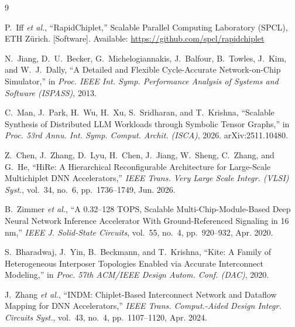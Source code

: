 \documentclass[conference]{IEEEtran}
\begin{document}
\begin{thebibliography}{9}

P.~Iff \emph{et al.}, ``RapidChiplet,'' Scalable Parallel Computing Laboratory (SPCL), ETH Z\"urich. [Software]. Available: \url{https://github.com/spcl/rapidchiplet}

N.~Jiang, D.~U.~Becker, G.~Michelogiannakis, J.~Balfour, B.~Towles, J.~Kim, and W.~J.~Dally, ``A Detailed and Flexible Cycle-Accurate Network-on-Chip Simulator,'' in \emph{Proc. IEEE Int. Symp. Performance Analysis of Systems and Software (ISPASS)}, 2013.

C.~Man, J.~Park, H.~Wu, H.~Xu, S.~Sridharan, and T.~Krishna, ``Scalable Synthesis of Distributed LLM Workloads through Symbolic Tensor Graphs,'' in \emph{Proc. 53rd Annu. Int. Symp. Comput. Archit. (ISCA)}, 2026. arXiv:2511.10480.

Z.~Chen, J.~Zhang, D.~Lyu, H.~Chen, J.~Jiang, W.~Sheng, C.~Zhang, and G.~He, ``HiRe: A Hierarchical Reconfigurable Architecture for Large-Scale Multichiplet DNN Accelerators,'' \emph{IEEE Trans. Very Large Scale Integr. (VLSI) Syst.}, vol.~34, no.~6, pp.~1736--1749, Jun. 2026.

B.~Zimmer \emph{et al.}, ``A 0.32--128 TOPS, Scalable Multi-Chip-Module-Based Deep Neural Network Inference Accelerator With Ground-Referenced Signaling in 16 nm,'' \emph{IEEE J. Solid-State Circuits}, vol.~55, no.~4, pp.~920--932, Apr. 2020.

S.~Bharadwaj, J.~Yin, B.~Beckmann, and T.~Krishna, ``Kite: A Family of Heterogeneous Interposer Topologies Enabled via Accurate Interconnect Modeling,'' in \emph{Proc. 57th ACM/IEEE Design Autom. Conf. (DAC)}, 2020.

J.~Zhang \emph{et al.}, ``INDM: Chiplet-Based Interconnect Network and Dataflow Mapping for DNN Accelerators,'' \emph{IEEE Trans. Comput.-Aided Design Integr. Circuits Syst.}, vol.~43, no.~4, pp.~1107--1120, Apr. 2024.

\end{thebibliography}
\end{document}
